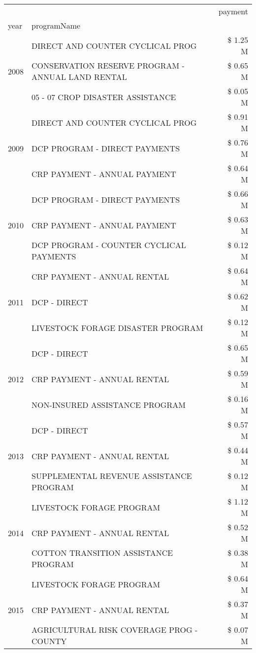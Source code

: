 \begin{tabular}{llr}
\toprule
 &  & payment \\
year & programName &  \\
\midrule
\multirow[t]{3}{*}{2008} & DIRECT AND COUNTER CYCLICAL PROG & \$ 1.25 M \\
 & CONSERVATION RESERVE PROGRAM - ANNUAL LAND RENTAL & \$ 0.65 M \\
 & 05 - 07 CROP DISASTER ASSISTANCE & \$ 0.05 M \\
\cline{1-3}
\multirow[t]{3}{*}{2009} & DIRECT AND COUNTER CYCLICAL PROG & \$ 0.91 M \\
 & DCP PROGRAM - DIRECT PAYMENTS & \$ 0.76 M \\
 & CRP PAYMENT - ANNUAL PAYMENT & \$ 0.64 M \\
\cline{1-3}
\multirow[t]{3}{*}{2010} & DCP PROGRAM - DIRECT PAYMENTS & \$ 0.66 M \\
 & CRP PAYMENT - ANNUAL PAYMENT & \$ 0.63 M \\
 & DCP PROGRAM - COUNTER CYCLICAL PAYMENTS & \$ 0.12 M \\
\cline{1-3}
\multirow[t]{3}{*}{2011} & CRP PAYMENT - ANNUAL RENTAL & \$ 0.64 M \\
 & DCP - DIRECT & \$ 0.62 M \\
 & LIVESTOCK FORAGE DISASTER PROGRAM & \$ 0.12 M \\
\cline{1-3}
\multirow[t]{3}{*}{2012} & DCP - DIRECT & \$ 0.65 M \\
 & CRP PAYMENT - ANNUAL RENTAL & \$ 0.59 M \\
 & NON-INSURED ASSISTANCE PROGRAM & \$ 0.16 M \\
\cline{1-3}
\multirow[t]{3}{*}{2013} & DCP - DIRECT & \$ 0.57 M \\
 & CRP PAYMENT - ANNUAL RENTAL & \$ 0.44 M \\
 & SUPPLEMENTAL REVENUE ASSISTANCE PROGRAM & \$ 0.12 M \\
\cline{1-3}
\multirow[t]{3}{*}{2014} & LIVESTOCK FORAGE PROGRAM & \$ 1.12 M \\
 & CRP PAYMENT - ANNUAL RENTAL & \$ 0.52 M \\
 & COTTON TRANSITION ASSISTANCE PROGRAM & \$ 0.38 M \\
\cline{1-3}
\multirow[t]{3}{*}{2015} & LIVESTOCK FORAGE PROGRAM & \$ 0.64 M \\
 & CRP PAYMENT - ANNUAL RENTAL & \$ 0.37 M \\
 & AGRICULTURAL RISK COVERAGE PROG - COUNTY & \$ 0.07 M \\
\cline{1-3}

\end{tabular}
